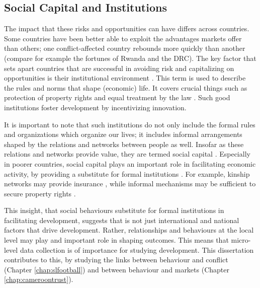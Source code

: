 \subsection{Social Capital and Institutions}
The impact that these risks and opportunities can have differs across countries. Some countries have been better able to exploit the advantages markets offer than others; one conflict-affected country rebounds more quickly than another (compare for example the fortunes of Rwanda and the DRC). The key factor that sets apart countries that are successful in avoiding risk and capitalizing on opportunities is their institutional environment \citep{Rodrik2004,Acemoglu2000}. This term is used to describe the rules and norms that shape (economic) life. It covers crucial things such as protection of property rights and equal treatment by the law \citep{Acemoglu2005}. Such good institutions  foster development by incentivizing innovation. %

It is important to note that such institutions do not only include the formal rules and organizations which organize our lives; it includes informal arrangements shaped by the relations and networks between people as well. Insofar as these relations and networks provide value, they are termed social capital \citep[see for a more detailed discussion of the definition of the term][]{Putnam2001}. Especially in poorer countries, social capital plays an important role in facilitating economic activity, by providing a substitute for formal institutions \citep{Knack1997}. For example, kinship networks may provide insurance \citep{DiFalco2011}, while informal mechanisms may be sufficient to secure property rights \citep{Platteau1996}. 

This insight, that social behaviours substitute for formal institutions in facilitating development, suggests that is not just international and national factors that drive development. Rather, relationships and behaviours at the local level may play and important role in shaping outcomes. This means that micro-level data collection is of importance for studying development. This dissertation contributes to this, by studying the links between behaviour and conflict (Chapter \ref{chap:slfootball}) and between behaviour and markets (Chapter \ref{chap:cameroontrust}).

